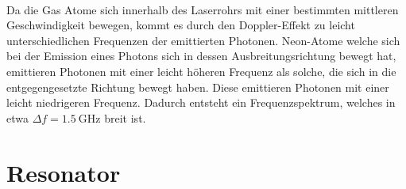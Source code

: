 \\Da die Gas Atome sich innerhalb des Laserrohrs mit einer bestimmten mittleren Geschwindigkeit bewegen, kommt es durch den Doppler-Effekt zu leicht unterschiedlichen
Frequenzen der emittierten Photonen. Neon-Atome welche sich bei der Emission eines Photons sich in dessen Ausbreitungsrichtung bewegt hat, emittieren Photonen mit einer
leicht höheren Frequenz als solche, die sich in die entgegengesetzte Richtung bewegt haben. Diese emittieren Photonen mit einer leicht niedrigeren Frequenz. Dadurch entsteht
ein Frequenzspektrum, welches in etwa $\Delta f = \qty{1.5}{\giga\hertz}$\cite{Wikipedia_HeNe} breit ist.

\section{Resonator}
\label{sec:resonator}

